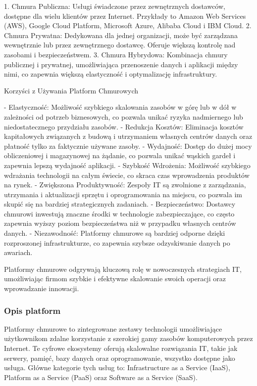 1. Chmura Publiczna: Usługi świadczone przez zewnętrznych dostawców, dostępne dla wielu klientów przez Internet. Przykłady to Amazon Web Services (AWS), Google Cloud Platform, Microsoft Azure, Alibaba Cloud i IBM Cloud.
2. Chmura Prywatna: Dedykowana dla jednej organizacji, może być zarządzana wewnętrznie lub przez zewnętrznego dostawcę. Oferuje większą kontrolę nad zasobami i bezpieczeństwem.
3. Chmura Hybrydowa: Kombinacja chmury publicznej i prywatnej, umożliwiająca przenoszenie danych i aplikacji między nimi, co zapewnia większą elastyczność i optymalizację infrastruktury.

Korzyści z Używania Platform Chmurowych

- Elastyczność: Możliwość szybkiego skalowania zasobów w górę lub w dół w zależności od potrzeb biznesowych, co pozwala unikać ryzyka nadmiernego lub niedostatecznego przydziału zasobów.
- Redukcja Kosztów: Eliminacja kosztów kapitałowych związanych z budową i utrzymaniem własnych centrów danych oraz płatność tylko za faktycznie używane zasoby.
- Wydajność: Dostęp do dużej mocy obliczeniowej i magazynowej na żądanie, co pozwala unikać wąskich gardeł i zapewnia lepszą wydajność aplikacji.
- Szybkość Wdrożenia: Możliwość szybkiego wdrażania technologii na całym świecie, co skraca czas wprowadzenia produktów na rynek.
- Zwiększona Produktywność: Zespoły IT są zwolnione z zarządzania, utrzymania i aktualizacji sprzętu i oprogramowania na miejscu, co pozwala im skupić się na bardziej strategicznych zadaniach.
- Bezpieczeństwo: Dostawcy chmurowi inwestują znaczne środki w technologie zabezpieczające, co często zapewnia wyższy poziom bezpieczeństwa niż w przypadku własnych centrów danych.
- Niezawodność: Platformy chmurowe są bardziej odporne dzięki rozproszonej infrastrukturze, co zapewnia szybsze odzyskiwanie danych po awariach.

Platformy chmurowe odgrywają kluczową rolę w nowoczesnych strategiach IT, umożliwiając firmom szybkie i efektywne skalowanie swoich operacji oraz wprowadzanie innowacji.
\subsubsection{Opis platform}
Platformy chmurowe to zintegrowane zestawy technologii umożliwiające użytkownikom zdalne korzystanie z szerokiej gamy zasobów komputerowych przez Internet. Te cyfrowe ekosystemy oferują skalowalne rozwiązania IT, takie jak serwery, pamięć, bazy danych oraz oprogramowanie, wszystko dostępne jako usługa. Główne kategorie tych usług to: Infrastructure as a Service (IaaS), Platform as a Service (PaaS) oraz Software as a Service (SaaS).

